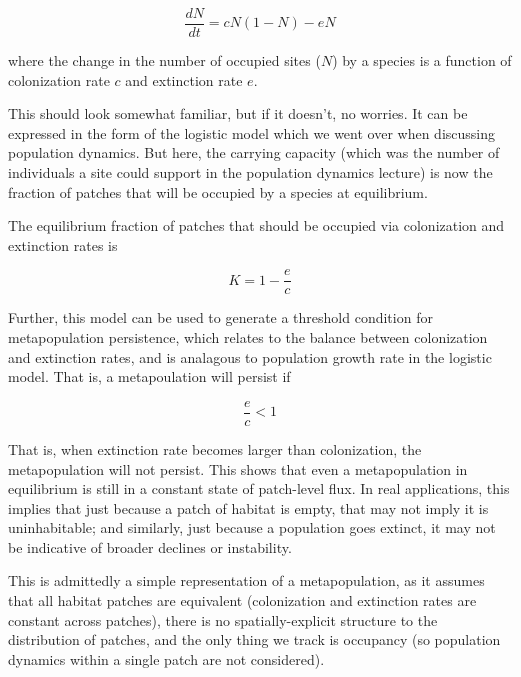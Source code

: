 \documentclass[12pt]{article}
\begin{document}
\begin{equation}
\frac{dN}{dt} = cN(1-N) - eN
\end{equation}

where the change in the number of occupied sites ($N$) by a species is a function of colonization rate $c$ and extinction rate $e$. 

This should look somewhat familiar, but if it doesn't, no worries. It can be expressed in the form of the logistic model which we went over when discussing population dynamics. But here, the carrying capacity (which was the number of individuals a site could support in the population dynamics lecture) is now the fraction of patches that will be occupied by a species at equilibrium. 

The equilibrium fraction of patches that should be occupied via colonization and extinction rates is 

\begin{equation}
K = 1 - \frac{e}{c}
\end{equation}

Further, this model can be used to generate a threshold condition for metapopulation persistence, which relates to the balance between colonization and extinction rates, and is analagous to population growth rate in the logistic model. That is, a metapoulation will persist if 

\begin{equation}
  \frac{e}{c} < 1 
\end{equation}

That is, when extinction rate becomes larger than colonization, the metapopulation will not persist. This shows that even a metapopulation in equilibrium is still in a constant state of patch-level flux. In real applications, this implies that just because a patch of habitat is empty, that may not imply it is uninhabitable; and similarly, just because a population goes extinct, it may not be indicative of broader declines or instability.



This is admittedly a simple representation of a metapopulation, as it assumes that all habitat patches are equivalent (colonization and extinction rates are constant across patches), there is no spatially-explicit structure to the distribution of patches, and the only thing we track is occupancy (so population dynamics within a single patch are not considered). 
\end{document}
